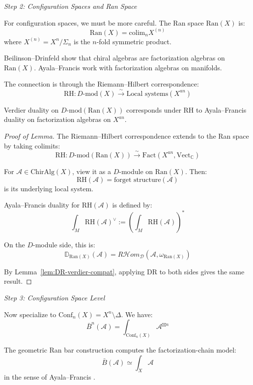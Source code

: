 \emph{Step 2: Configuration Spaces and Ran Space}

For configuration spaces, we must be more careful. The Ran space $\text{Ran}(X)$ is:
\[\text{Ran}(X) = \text{colim}_{n} X^{(n)}\]
where $X^{(n)} = X^n / \Sigma_n$ is the $n$-fold symmetric product.

Beilinson--Drinfeld \cite{BD04} show that chiral algebras are factorization algebras on
$\text{Ran}(X)$. Ayala--Francis \cite{AF15} work with factorization algebras on manifolds.

The connection is through the Riemann--Hilbert correspondence:
\[\text{RH}: D\text{-mod}(X) \xrightarrow{\sim} \text{Local systems}(X^{an})\]

\begin{lemma}\label{lem:ran-duality-AF}
Verdier duality on $D\text{-mod}(\text{Ran}(X))$ corresponds under $\text{RH}$ to
Ayala--Francis duality on factorization algebras on $X^{an}$.
\end{lemma}

\begin{proof}[Proof of Lemma]
The Riemann--Hilbert correspondence extends to the Ran space by taking colimits:
\[\text{RH}: D\text{-mod}(\text{Ran}(X)) \xrightarrow{\sim}
\text{Fact}(X^{an}, \text{Vect}_\mathbb{C})\]

For $\mathcal{A} \in \text{ChirAlg}(X)$, view it as a $D$-module on $\text{Ran}(X)$. Then:
\[\text{RH}(\mathcal{A}) = \text{forget structure}(\mathcal{A})\]
is its underlying local system.

Ayala--Francis duality for $\text{RH}(\mathcal{A})$ is defined by:
\[\int_M \text{RH}(\mathcal{A})^{\vee} := \left(\int_M \text{RH}(\mathcal{A})\right)^*\]

On the $D$-module side, this is:
\[\mathbb{D}_{\text{Ran}(X)}(\mathcal{A}) = R\mathcal{H}om_{\mathcal{D}}(\mathcal{A},
\omega_{\text{Ran}(X)})\]

By Lemma~\ref{lem:DR-verdier-compat}, applying $\text{DR}$ to both sides gives the same result.
\end{proof}

\emph{Step 3: Configuration Space Level}

Now specialize to $\text{Conf}_n(X) = X^n \setminus \Delta$. We have:
\[\bar{B}^n(\mathcal{A}) = \int_{\text{Conf}_n(X)} \mathcal{A}^{\boxtimes n}\]

\begin{lemma}\label{lem:bar-as-fact-hom-AF}
The geometric Ran bar construction computes the factorization-chain model:
\[\bar{B}(\mathcal{A}) \simeq \int_{X} \mathcal{A}\]
in the sense of Ayala--Francis \cite{AF15}.
\end{lemma}

